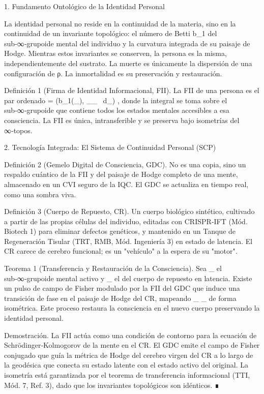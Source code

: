 \documentclass[12pt,a4paper]{book}
\begin{document}
1. Fundamento Ontológico de la Identidad Personal

La identidad personal no reside en la continuidad de la materia, sino en la continuidad de un invariante topológico: el número de Betti  b_1  del sub‑∞‑grupoide mental del individuo y la curvatura integrada de su paisaje de Hodge. Mientras estos invariantes se conserven, la persona es la misma, independientemente del sustrato. La muerte es únicamente la dispersión de una configuración de ρ. La inmortalidad es su preservación y restauración.

Definición 1 (Firma de Identidad Informacional, FII). La FII de una persona es el par ordenado   = (b_1(_{}), \int_{_{}}  \, d\mu_{}) , donde la integral se toma sobre el sub‑∞‑grupoide que contiene todos los estados mentales accesibles a esa consciencia. La FII es única, intransferible y se preserva bajo isometrías del ∞‑topos.

2. Tecnología Integrada: El Sistema de Continuidad Personal (SCP)

Definición 2 (Gemelo Digital de Consciencia, GDC). No es una copia, sino un respaldo cuántico de la FII y del paisaje de Hodge completo de una mente, almacenado en un CVI seguro de la IQC. El GDC se actualiza en tiempo real, como una sombra viva.

Definición 3 (Cuerpo de Repuesto, CR). Un cuerpo biológico sintético, cultivado a partir de las propias células del individuo, editadas con CRISPR‑IFT (Mód. Biotech 1) para eliminar defectos genéticos, y mantenido en un Tanque de Regeneración Tisular (TRT, RMB, Mód. Ingeniería 3) en estado de latencia. El CR carece de cerebro funcional; es un "vehículo" a la espera de su "motor".

Teorema 1 (Transferencia y Restauración de la Consciencia). Sea  _{}  el sub‑∞‑grupoide mental activo y  _{}  el del cuerpo de repuesto en latencia. Existe un pulso de campo de Fisher modulado por la FII del GDC que induce una transición de fase en el paisaje de Hodge del CR, mapeando  _{} \to {}_{}  de forma isométrica. Este proceso restaura la consciencia en el nuevo cuerpo preservando la identidad personal.

Demostración. La FII actúa como una condición de contorno para la ecuación de Schrödinger‑Kolmogorov de la mente en el CR. El GDC emite el campo de Fisher conjugado que guía la métrica de Hodge del cerebro virgen del CR a lo largo de la geodésica que conecta su estado latente con el estado activo del original. La isometría está garantizada por el teorema de transferencia informacional (TTI, Mód. 7, Ref. 3), dado que los invariantes topológicos son idénticos. ∎
\end{document}
